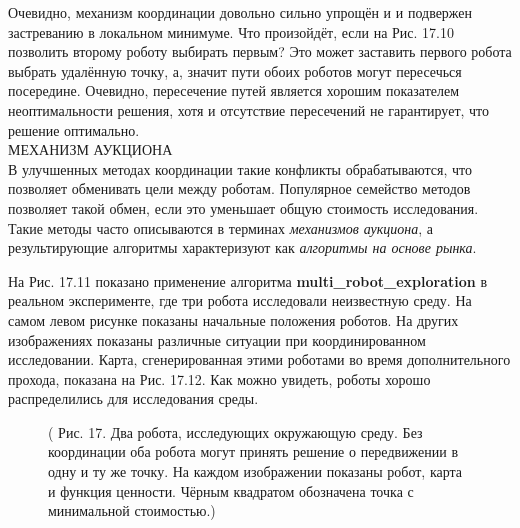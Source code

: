\documentclass[10pt,a4paper]{article}
\begin{document}
Очевидно, механизм координации довольно сильно упрощён и и подвержен застреванию в локальном минимуме. Что произойдёт, если на Рис. 17.10 позволить второму роботу выбирать первым? Это может заставить первого робота выбрать удалённую точку, а, значит пути обоих роботов могут пересечься посередине. Очевидно, пересечение путей является хорошим показателем неоптимальности решения, хотя и отсутствие пересечений не гарантирует, что решение оптимально.\\

МЕХАНИЗМ АУКЦИОНА\\

В улучшенных методах координации такие конфликты обрабатываются, что позволяет обменивать цели между роботам. Популярное семейство методов позволяет такой обмен, если это уменьшает общую стоимость исследования. Такие методы часто описываются в терминах \textit{механизмов аукциона}, а результирующие алгоритмы характеризуют как \textit{алгоритмы на основе рынка}.

На Рис. 17.11 показано применение алгоритма \textbf{multi\_robot\_exploration} в реальном эксперименте, где три робота исследовали неизвестную среду. На самом левом рисунке показаны начальные положения роботов. На других изображениях показаны различные ситуации при координированном исследовании. Карта, сгенерированная этими роботами во время дополнительного прохода, показана на Рис. 17.12. Как можно увидеть, роботы хорошо распределились для исследования среды.

\begin{figure}[H]
	\caption{ ( Рис. 17. Два робота, исследующих окружающую среду. Без координации оба робота могут принять решение о передвижении в одну и ту же точку. На каждом изображении показаны робот, карта и функция ценности. Чёрным квадратом обозначена точка с минимальной стоимостью.) }
	\label{fig:179orig}
\end{figure}
\end{document}
